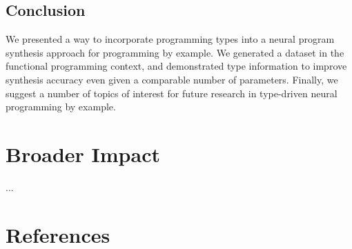 \documentclass{article} %
\begin{document}

\subsection{Conclusion}

We presented a way to incorporate programming types into a neural program synthesis approach for programming by example.
We generated a dataset in the functional programming context,
and demonstrated type information to improve synthesis accuracy even given a comparable number of parameters.
Finally, we suggest a number of topics of interest for future research in type-driven neural programming by example.


\section*{Broader Impact}

...

\section*{References}

% 

% 





\end{document}
